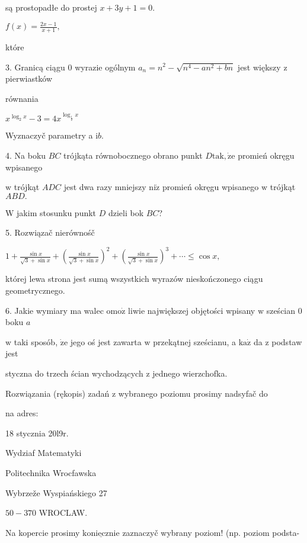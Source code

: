 \documentclass[a4paper,12pt]{article}
\begin{document}
są prostopadłe do prostej $x+3y+1=0.$

$f(x) = \displaystyle \frac{2x-1}{x+1},$

które

3. Granicą ciągu $0$ wyrazie ogólnym $a_{n}=n^{2}-\sqrt{n^{4}-an^{2}+bn}$ jest większy $\mathrm{z}$ pierwiastków

równania

$x^{\log_{2}x}-3=4x^{\log_{\frac{1}{2}}x}$

Wyznaczyč parametry a $\mathrm{i}b.$

4. Na boku $BC$ trójkąta równobocznego obrano punkt $D\mathrm{t}\mathrm{a}\mathrm{k}, \dot{\mathrm{z}}\mathrm{e}$ promień okręgu wpisanego

$\mathrm{w}$ trójkąt $ADC$ jest dwa razy mniejszy $\mathrm{n}\mathrm{i}\dot{\mathrm{z}}$ promień okręgu wpisanego $\mathrm{w}$ trójkąt $ABD.$

$\mathrm{W}$ jakim stosunku punkt $D$ dzieli bok $BC$?

5. Rozwiązač nierównośč

$1+\displaystyle \frac{\sin x}{\sqrt{3}+\sin x}+(\frac{\sin x}{\sqrt{3}+\sin x})^{2}+(\frac{\sin x}{\sqrt{3}+\sin x})^{3}+\cdots\leq\cos x,$

której lewa strona jest sumą wszystkich wyrazów nieskończonego ciągu geometrycznego.

6. Jakie wymiary ma walec $\mathrm{o}\mathrm{m}\mathrm{o}\dot{\mathrm{z}}$ liwie największej objętości wpisany $\mathrm{w}$ sześcian $0$ boku $a$

$\mathrm{w}$ taki sposób, $\dot{\mathrm{z}}\mathrm{e}$ jego oś jest zawarta $\mathrm{w}$ przekątnej sześcianu, a $\mathrm{k}\mathrm{a}\dot{\mathrm{z}}$ da $\mathrm{z}$ podstaw jest

styczna do trzech ścian wychodzących $\mathrm{z}$ jednego wierzchofka.

Rozwiązania (rękopis) zadań z wybranego poziomu prosimy nadsyfač do

na adres:

18 stycznia 20l9r.

Wydziaf Matematyki

Politechnika Wrocfawska

Wybrzeže Wyspiańskiego 27

$50-370$ WROCLAW.

Na kopercie prosimy $\underline{\mathrm{k}\mathrm{o}\mathrm{n}\mathrm{i}\mathrm{e}\mathrm{c}\mathrm{z}\mathrm{n}\mathrm{i}\mathrm{e}}$ zaznaczyč wybrany poziom! (np. poziom podsta-
\end{document}
